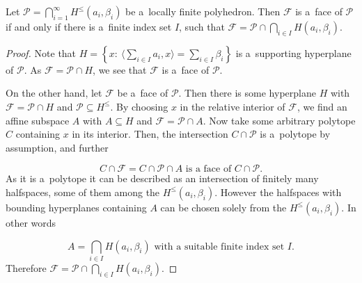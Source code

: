 \documentclass[10pt,a4paper]{amsart}
\newcommand{\lfpfacef}{\mathcal{F}}
\newcommand{\lfp}{\mathcal{P}}
\begin{document}
\begin{lemma}\label{lem:faceanalog}
	Let \(\lfp=\bigcap_{i=1}^{\infty}H^{\leq}(a_i,\beta_i) \) be a~locally finite polyhedron.
	Then \(\lfpfacef \) is a~face of \(\lfp \) if and only if there is a~finite index set $I$,
	such that \(\lfpfacef=\lfp\cap\bigcap_{i\in I}H(a_i,\beta_i) \).
\end{lemma}

\begin{proof}
	Note that \(H=\left\{ x:\ \langle\sum_{i\in I}a_i,x\rangle = \sum_{i\in I}\beta_i \right\} \)
	is a~supporting hyperplane of \(\lfp \).
    As \(\lfpfacef=\lfp\cap H \), we see that \(\lfpfacef \) is a~face of \(\lfp \).

	On the other hand, let \(\lfpfacef \) be a~face of \(\lfp \).
	Then there is some hyperplane $H$ with \(\lfpfacef = \lfp\cap H \) and
    \(\lfp\subseteq H^{\leq} \).
	By choosing $x$ in the relative interior of \(\lfpfacef \), we find an affine subspace $A$
	with \(A \subseteq H \) and \(\lfpfacef = \lfp\cap A \).
	Now take some arbitrary polytope $C$ containing $x$ in its interior.
	Then, the intersection \(C\cap\lfp \) is a~polytope by assumption, and further
	
\[
		C\cap\lfpfacef=C\cap\lfp\cap A \text{ is a~face of } C\cap\lfp.
\]
	As it is a~polytope it can be described as an intersection of finitely many halfspaces, some of
	them among the \(H^{\leq}(a_i, \beta_i) \).
	However the halfspaces with bounding hyperplanes containing $A$ can be chosen solely from the
	\(H^{\leq}(a_i, \beta_i) \).
	In other words
	
\[
		A = \bigcap_{i\in I}H(a_i, \beta_i) \text{ with a~suitable finite index set } I.
\]
	Therefore
	\(\lfpfacef = \lfp\cap\bigcap_{i\in I}H(a_i, \beta_i). \)
\end{proof}
\end{document}
